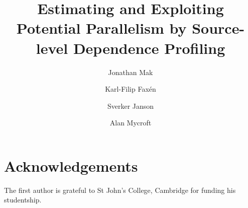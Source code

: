 \documentclass{llncs}
\begin{document}
\pagestyle{plain}

\title{Estimating and Exploiting Potential Parallelism by Source-level Dependence Profiling}

\author{Jonathan Mak
   \and Karl-Filip Fax\'en
   \and Sverker Janson
   \and Alan Mycroft
}

          
\maketitle 





\section*{Acknowledgements}

The first author is grateful to St John's College, Cambridge for funding his studentship.


{}
\end{document}
